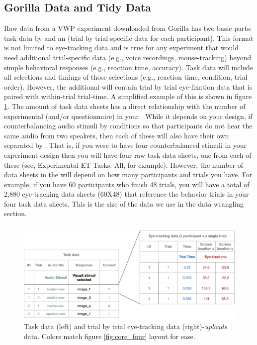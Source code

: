 \subsection{Gorilla Data and Tidy Data}

Raw data from a VWP experiment downloaded from Gorilla has two basic parts: task data by  and an  (trial by trial specific data for each participant). This format is not limited to eye-tracking data and is true for any experiment that would need additional trial-specific data (e.g., voice recordings, mouse-tracking) beyond simple behavioral responses (e.g., reaction time, accuracy). Task data will include all selections and timings of those selections (e.g., reaction time, condition, trial order). However, the additional  will contain trial by trial eye-fixation data that is paired with within-trial trial-time. A simplified example of this is shown in figure \ref{fig:data_structure}. The amount of task data sheets has a direct relationship with the number of experimental (and/or questionnaire)  in your . While it depends on your design, if counterbalancing audio stimuli by conditions so that participants do not hear the same audio from two speakers, then each of these will also have their own  separated by . That is, if you were to have four counterbalanced stimuli  in your experiment design then you will have four raw task data sheets, one from each of these  (see, Experimental ET Tasks: All, for example). However, the number of data sheets in the  will depend on how many participants and trials you have. For example, if you have 60 participants who finish 48 trials, you will have a total of 2,880 eye-tracking data sheets (60X48) that reference the behavior trials in your four task data sheets. This is the size of the data we use in the data wrangling section.

\begin{figure}[ht]
    \centering
    \includegraphics[scale=.3]{figures/data_structure.png}
    \caption{Task data (left) and trial by trial eye-tracking data (right)-\textit{uploads} data. Colors match figure \ref{fig:core_four} layout for ease.}
    \label{fig:data_structure}
\end{figure}

